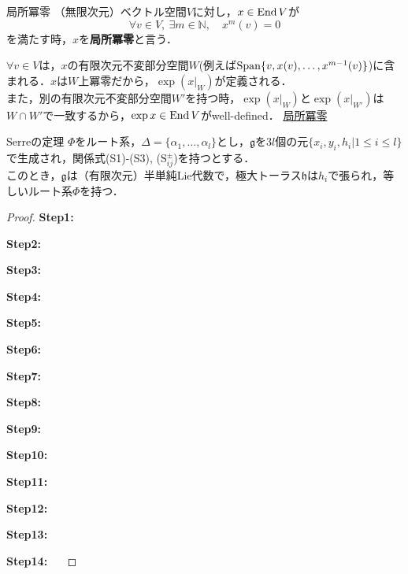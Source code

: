 \documentclass[rep_main]{subfiles}
\begin{document}
\begin{mydef}[label=def:locally-nilpotent]{局所冪零}
	（無限次元）ベクトル空間$V$に対し，$x \in \operatorname{End} V$が
	\begin{equation}
		\forall v \in V,\ \exists m \in \mathbb{N},\quad  x^m(v) = 0
	\end{equation}
	を満たす時，$x$を\textbf{局所冪零}と言う．
\end{mydef}
$\forall v \in V$は，$x$の有限次元不変部分空間$W$(例えば$\operatorname{Span}\{v, x(v),\ldots , x^{m-1}(v)\}$)に含まれる．$x$は$W$上冪零だから，$\exp(x|_W)$が定義される．\\
また，別の有限次元不変部分空間$W'$を持つ時，$\exp(x|_W)$と$\exp(x|_{W'})$は$W \cap W'$で一致するから，$\exp x \in \operatorname{End} V$がwell-defined．
\hyperref[locally-nilpotent]{局所冪零}
\begin{mytheo}[label=thm:Serre]{Serreの定理}
	$\Phi$をルート系，$\Delta = \{\alpha_1, \ldots, \alpha_l\}$とし，$\mathfrak{g}$を$3l$個の元$\{x_i, y_i, h_i | 1 \leq i \leq l\}$で生成され，関係式(S1)-(S3), ($\text{S}_{ij}^\pm$)を持つとする．\\
	このとき，$\mathfrak{g}$は（有限次元）半単純Lie代数で，極大トーラス$\mathfrak{h}$は$h_i$で張られ，等しいルート系$\Phi$を持つ．
\end{mytheo}
\begin{proof}
		\item[\textbf{Step1: }]　
		
		\item[\textbf{Step2: }]　
		
		\item[\textbf{Step3: }]　
		
		\item[\textbf{Step4: }]　
		
		\item[\textbf{Step5: }]　
		
		\item[\textbf{Step6: }]　
		
		\item[\textbf{Step7: }]　
		
		\item[\textbf{Step8: }]　
		
		\item[\textbf{Step9: }]　
		
		\item[\textbf{Step10: }]　
		
		\item[\textbf{Step11: }]　
		
		\item[\textbf{Step12: }]　
		
		\item[\textbf{Step13: }]　
		
		\item[\textbf{Step14: }]　
		
\end{proof}
\end{document}
